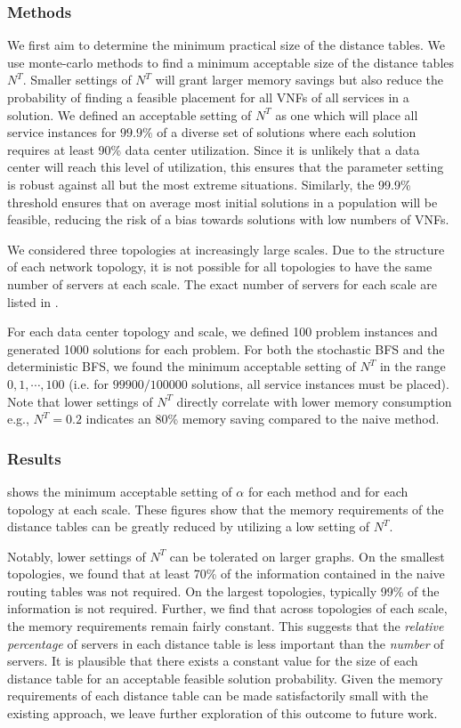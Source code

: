 \subsubsection{Methods}
We first aim to determine the minimum practical size of the distance tables. We use monte-carlo methods to find a minimum acceptable size of the distance tables $N^T$. Smaller settings of $N^T$ will grant larger memory savings but also reduce the probability of finding a feasible placement for all VNFs of all services in a solution. We defined an acceptable setting of $N^T$ as one which will place all service instances for $99.9\%$ of a diverse set of solutions where each solution requires at least 90\% data center utilization. Since it is unlikely that a data center will reach this level of utilization, this ensures that the parameter setting is robust against all but the most extreme situations. Similarly, the 99.9\% threshold ensures that on average most initial solutions in a population will be feasible, reducing the risk of a bias towards solutions with low numbers of VNFs.

We considered three topologies at increasingly large scales. Due to the structure of each network topology, it is not possible for all topologies to have the same number of servers at each scale. The exact number of servers for each scale are listed in .

For each data center topology and scale, we defined 100 problem instances and generated 1000 solutions for each problem. For both the stochastic BFS and the deterministic BFS, we found the minimum acceptable setting of $N^T$ in the range $0, 1, \cdots, 100$ (i.e. for $99900/100000$ solutions, all service instances must be placed). Note that lower settings of $N^T$ directly correlate with lower memory consumption e.g., $N^T = 0.2$ indicates an 80\% memory saving compared to the naive method.

\subsubsection{Results}
 shows the minimum acceptable setting of $\alpha$ for each method and for each topology at each scale. These figures show that the memory requirements of the distance tables can be greatly reduced by utilizing a low setting of $N^T$.

Notably, lower settings of $N^T$ can be tolerated on larger graphs. On the smallest topologies, we found that at least 70\% of the information contained in the naive routing tables was not required. On the largest topologies, typically 99\% of the information is not required. Further, we find that across topologies of each scale, the memory requirements remain fairly constant. This suggests that the \textit{relative percentage} of servers in each distance table is less important than the \textit{number} of servers. It is plausible that there exists a constant value for the size of each distance table for an acceptable feasible solution probability. Given the memory requirements of each distance table can be made satisfactorily small with the existing approach, we leave further exploration of this outcome to future work.


